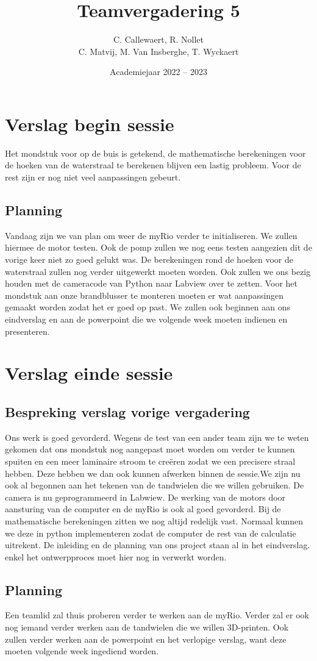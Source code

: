 \documentclass{kulakarticle}
\title{Teamvergadering 5}
\author{C. Callewaert, R. Nollet \\
	C. Matvij, M. Van Insberghe, T. Wyckaert }
\date{Academiejaar 2022 -- 2023}
\begin{document}
	\maketitle
	\section{Verslag begin sessie}
	Het mondstuk voor op de buis is getekend, de mathematische berekeningen voor de hoeken van de waterstraal te berekenen blijven een lastig probleem. Voor de rest zijn er nog niet veel aanpassingen gebeurt.

	\subsection{Planning}
	Vandaag zijn we van plan om weer de myRio verder te initialiseren. We zullen hiermee de motor testen. Ook de pomp zullen we nog eens testen aangezien dit de vorige keer niet zo goed gelukt was. De berekeningen rond de hoeken voor de waterstraal zullen nog verder uitgewerkt moeten worden. Ook zullen we ons bezig houden met de cameracode van Python naar Labview over te zetten. Voor het mondstuk aan onze brandblusser te monteren moeten er wat aanpassingen gemaakt worden zodat het er goed op past. We zullen ook beginnen aan ons eindverslag en aan de powerpoint die we volgende week moeten indienen en presenteren.
	
	
	\section{Verslag einde sessie}
	

	
	\subsection{Bespreking verslag vorige vergadering}
	
		Ons werk is goed gevorderd. Wegens de test van een ander team zijn we te weten gekomen dat ons mondstuk nog aangepast moet worden om verder te kunnen spuiten en een meer laminaire stroom te creëren zodat we een precisere straal hebben. Deze hebben we dan ook kunnen afwerken binnen de sessie.We zijn nu ook al begonnen aan het tekenen van de tandwielen die we willen gebruiken. De camera is nu geprogrammeerd in Labwiew. De werking van de motors door aansturing van de computer en de myRio is ook al goed gevorderd. Bij de mathematische berekeningen zitten we nog altijd redelijk vast. Normaal kunnen we deze in python implementeren zodat de computer de rest van de calculatie uitrekent. De inleiding en de planning van ons project staan al in het eindverslag. enkel het ontwerpproces moet hier nog in verwerkt worden.
	
	
	\subsection{Planning}
	
	Een teamlid zal thuis proberen verder te werken aan de myRio. Verder zal er ook nog iemand verder werken aan de tandwielen die we willen 3D-printen. Ook zullen verder werken aan de powerpoint en het verlopige verslag, want deze moeten volgende week ingediend worden. 

	
\end{document}
